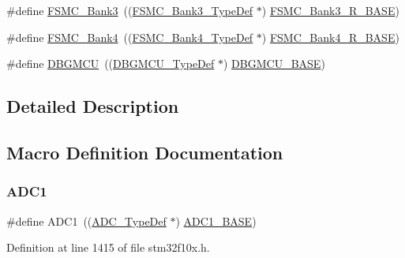 \begin{DoxyCompactItemize}
\item 
\#define \hyperlink{group___peripheral__declaration_ga411eedc00b5b2b22b494004d4f41b736}{F\+S\+M\+C\+\_\+\+Bank3}~((\hyperlink{struct_f_s_m_c___bank3___type_def}{F\+S\+M\+C\+\_\+\+Bank3\+\_\+\+Type\+Def} $\ast$) \hyperlink{group___peripheral__memory__map_gacf056152c9e5aefcc67db78d1302c0d7}{F\+S\+M\+C\+\_\+\+Bank3\+\_\+\+R\+\_\+\+B\+A\+SE})
\item 
\#define \hyperlink{group___peripheral__declaration_ga5aa00e4ac522693c6a21bc23ef5a96df}{F\+S\+M\+C\+\_\+\+Bank4}~((\hyperlink{struct_f_s_m_c___bank4___type_def}{F\+S\+M\+C\+\_\+\+Bank4\+\_\+\+Type\+Def} $\ast$) \hyperlink{group___peripheral__memory__map_gaf9e5417133160b0bdd0498d982acec19}{F\+S\+M\+C\+\_\+\+Bank4\+\_\+\+R\+\_\+\+B\+A\+SE})
\item 
\#define \hyperlink{group___peripheral__declaration_ga92ec6d9ec2251fda7d4ce09748cd74b4}{D\+B\+G\+M\+CU}~((\hyperlink{struct_d_b_g_m_c_u___type_def}{D\+B\+G\+M\+C\+U\+\_\+\+Type\+Def} $\ast$) \hyperlink{group___peripheral__memory__map_ga4adaf4fd82ccc3a538f1f27a70cdbbef}{D\+B\+G\+M\+C\+U\+\_\+\+B\+A\+SE})
\end{DoxyCompactItemize}


\subsection{Detailed Description}


\subsection{Macro Definition Documentation}
\mbox{\label{group___peripheral__declaration_ga90d2d5c526ce5c0a551f533eccbee71a}} 
\subsubsection{\texorpdfstring{A\+D\+C1}{ADC1}}
{\footnotesize\ttfamily \#define A\+D\+C1~((\hyperlink{struct_a_d_c___type_def}{A\+D\+C\+\_\+\+Type\+Def} $\ast$) \hyperlink{group___peripheral__memory__map_ga695c9a2f892363a1c942405c8d351b91}{A\+D\+C1\+\_\+\+B\+A\+SE})}



Definition at line 1415 of file stm32f10x.\+h.

